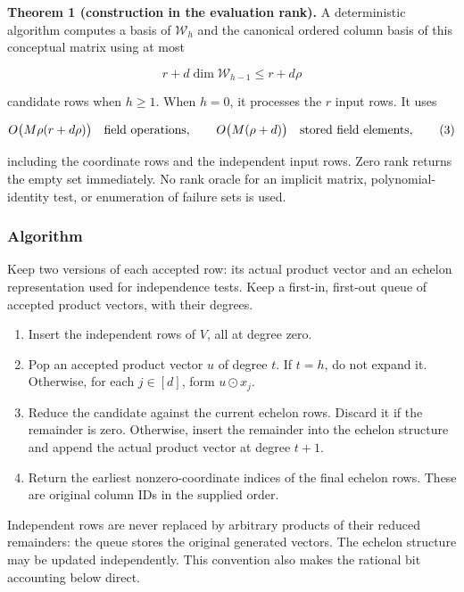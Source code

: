 \textbf{Theorem 1 (construction in the evaluation rank).} A deterministic algorithm computes a basis of \(\mathcal W_h\) and the canonical ordered column basis of this conceptual matrix using at most

\[
r+d\dim\mathcal W_{h-1}\le r+d\rho
\tag{2}
\]

candidate rows when \(h\ge1\). When \(h=0\), it processes the \(r\) input rows. It uses

\[
O\bigl(M\rho(r+d\rho)\bigr)
 \quad\hbox{field operations},\qquad
 O\bigl(M(\rho+d)\bigr)
 \quad\hbox{stored field elements},
\tag{3}
\]

including the coordinate rows and the independent input rows. Zero rank returns the empty set immediately. No rank oracle for an implicit matrix, polynomial-identity test, or enumeration of failure sets is used.

\hypertarget{af-4b125c3959-algorithm}{%
\subsubsection{Algorithm}\label{af-4b125c3959-algorithm}}

Keep two versions of each accepted row: its actual product vector and an echelon representation used for independence tests. Keep a first-in, first-out queue of accepted product vectors, with their degrees.

\begin{enumerate}
\def\labelenumi{\arabic{enumi}.}
\tightlist
\item
  Insert the independent rows of \(V\), all at degree zero.
\item
  Pop an accepted product vector \(u\) of degree \(t\). If \(t=h\), do not expand it. Otherwise, for each \(j\in[d]\), form \(u\odot x_j\).
\item
  Reduce the candidate against the current echelon rows. Discard it if the remainder is zero. Otherwise, insert the remainder into the echelon structure and append the actual product vector at degree \(t+1\).
\item
  Return the earliest nonzero-coordinate indices of the final echelon rows. These are original column IDs in the supplied order.
\end{enumerate}

Independent rows are never replaced by arbitrary products of their reduced remainders: the queue stores the original generated vectors. The echelon structure may be updated independently. This convention also makes the rational bit accounting below direct.

